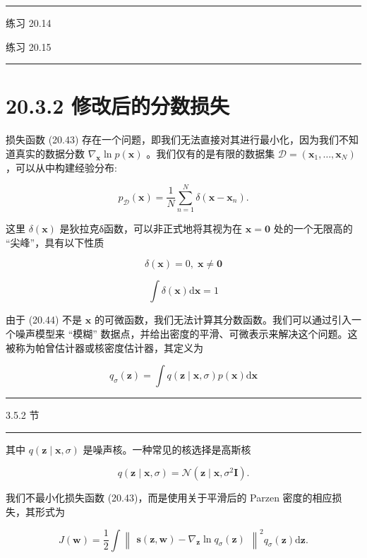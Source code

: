 \documentclass[10pt]{report}
\newcommand{\HRule}{\begin{center}\rule{0.9\linewidth}{0.2mm}\end{center}}
\begin{document}
\HRule

练习 20.14

练习 20.15

\HRule

\section*{20.3.2 修改后的分数损失}

损失函数 (20.43) 存在一个问题，即我们无法直接对其进行最小化，因为我们不知道真实的数据分数 \({\nabla }_{\mathbf{x}}\ln p\left( \mathbf{x}\right)\) 。我们仅有的是有限的数据集 \(\mathcal{D} = \left( {{\mathbf{x}}_{1},\ldots ,{\mathbf{x}}_{N}}\right)\) ，可以从中构建经验分布:

\[
{p}_{\mathcal{D}}\left( \mathbf{x}\right)  = \frac{1}{N}\mathop{\sum }\limits_{{n = 1}}^{N}\delta \left( {\mathbf{x} - {\mathbf{x}}_{n}}\right) . \tag{20.44}
\]

这里 \(\delta \left( \mathbf{x}\right)\) 是狄拉克δ函数，可以非正式地将其视为在 \(\mathbf{x} = \mathbf{0}\) 处的一个无限高的 “尖峰”，具有以下性质

\[
\delta \left( \mathbf{x}\right)  = 0,\;\mathbf{x} \neq  \mathbf{0} \tag{20.45}
\]

\[
\int \delta \left( \mathbf{x}\right) \mathrm{d}\mathbf{x} = 1 \tag{20.46}
\]

由于 (20.44) 不是 \(\mathbf{x}\) 的可微函数，我们无法计算其分数函数。我们可以通过引入一个噪声模型来 “模糊” 数据点，并给出密度的平滑、可微表示来解决这个问题。这被称为帕曾估计器或核密度估计器，其定义为

\[
{q}_{\sigma }\left( \mathbf{z}\right)  = \int q\left( {\mathbf{z} \mid  \mathbf{x},\sigma }\right) p\left( \mathbf{x}\right) \mathrm{d}\mathbf{x} \tag{20.47}
\]

\HRule

3.5.2 节

\HRule

其中 \(q\left( {\mathbf{z} \mid  \mathbf{x},\sigma }\right)\) 是噪声核。一种常见的核选择是高斯核

\[
q\left( {\mathbf{z} \mid  \mathbf{x},\sigma }\right)  = \mathcal{N}\left( {\mathbf{z} \mid  \mathbf{x},{\sigma }^{2}\mathbf{I}}\right) . \tag{20.48}
\]

我们不最小化损失函数 (20.43)，而是使用关于平滑后的 Parzen 密度的相应损失，其形式为

\[
J\left( \mathbf{w}\right)  = \frac{1}{2}\int {\begin{Vmatrix}\mathbf{s}\left( \mathbf{z},\mathbf{w}\right)  - {\nabla }_{\mathbf{z}}\ln {q}_{\sigma }\left( \mathbf{z}\right) \end{Vmatrix}}^{2}{q}_{\sigma }\left( \mathbf{z}\right) \mathrm{d}\mathbf{z}. \tag{20.49}
\]
\end{document}
